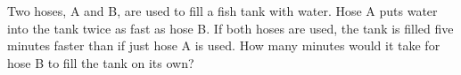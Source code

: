 Two hoses, A and B, are used to fill a fish tank with water. Hose A puts water into the tank twice as fast as hose B. If both hoses are used, the tank is filled five minutes faster than if just hose A is used. How many minutes would it take for hose B to fill the tank on its own?
